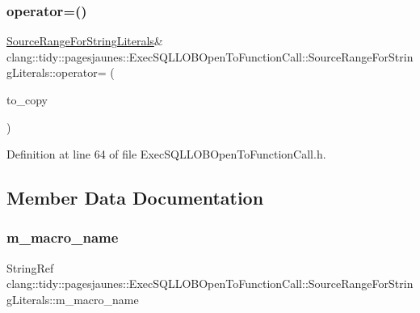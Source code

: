 \subsubsection{\texorpdfstring{operator=()}{operator=()}\hspace{0.1cm}{\footnotesize\ttfamily [2/2]}}
{\footnotesize\ttfamily \hyperlink{classclang_1_1tidy_1_1pagesjaunes_1_1_exec_s_q_l_l_o_b_open_to_function_call_1_1_source_range_for_string_literals}{Source\+Range\+For\+String\+Literals}\& clang\+::tidy\+::pagesjaunes\+::\+Exec\+S\+Q\+L\+L\+O\+B\+Open\+To\+Function\+Call\+::\+Source\+Range\+For\+String\+Literals\+::operator= (\begin{DoxyParamCaption}\item[{\hyperlink{classclang_1_1tidy_1_1pagesjaunes_1_1_exec_s_q_l_l_o_b_open_to_function_call_1_1_source_range_for_string_literals}{Source\+Range\+For\+String\+Literals} \&}]{to\+\_\+copy }\end{DoxyParamCaption})\hspace{0.3cm}{\ttfamily [inline]}}



Definition at line 64 of file Exec\+S\+Q\+L\+L\+O\+B\+Open\+To\+Function\+Call.\+h.



\subsection{Member Data Documentation}
\mbox{\label{classclang_1_1tidy_1_1pagesjaunes_1_1_exec_s_q_l_l_o_b_open_to_function_call_1_1_source_range_for_string_literals_a9817f6cedf3695400e6be48c3ecce99f}} 
\subsubsection{\texorpdfstring{m\+\_\+macro\+\_\+name}{m\_macro\_name}}
{\footnotesize\ttfamily String\+Ref clang\+::tidy\+::pagesjaunes\+::\+Exec\+S\+Q\+L\+L\+O\+B\+Open\+To\+Function\+Call\+::\+Source\+Range\+For\+String\+Literals\+::m\+\_\+macro\+\_\+name}




